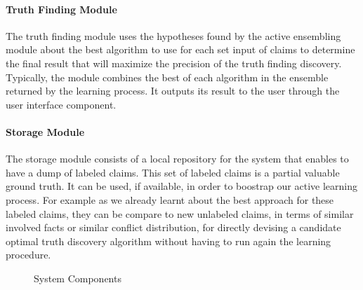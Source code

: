 \paragraph*{Truth Finding Module} The truth finding module uses the hypotheses found by the active ensembling 
module about the best algorithm to use for each set input of claims to determine the final result that will 
maximize the precision of the truth finding discovery. Typically, the module combines the best of each algorithm
in the ensemble returned by the learning process. It outputs its result to the user through the user interface component.



\paragraph*{Storage Module}The storage module consists of a local repository for the system
that enables to have a dump of labeled claims. This set of labeled claims is a partial valuable
ground truth. It can be used, if available, in order to boostrap our active learning process. For
example as we already learnt about the best approach for these labeled claims, they can be compare 
to new unlabeled claims, in terms of similar involved facts or similar conflict distribution, for 
directly devising a candidate optimal truth discovery algorithm without having to run again the learning 
procedure.

\begin{figure}[ht]
\caption{System Components}\label{system_architecture}
\end{figure}
